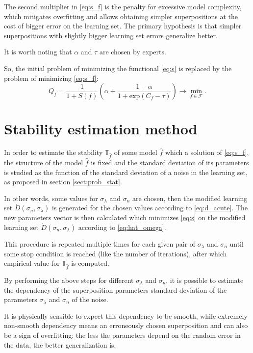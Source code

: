 \documentclass[11pt,a4paper]{article}
\theoremstyle{definition}
\begin{document}
The second multiplier in \eqref{eq:s_f} is the penalty for excessive model complexity,
which mitigates overfitting and allows obtaining simpler superpositions at the cost of
bigger error on the learning set. The primary hypothesis is that simpler superpositions
with slightly bigger learning set errors generalize better.

It is worth noting that $\alpha$ and $\tau$ are chosen by experts.

So, the initial problem of minimizing the functional \eqref{eq:s} is replaced by
the problem of minimizing \eqref{eq:s_f}:
\begin{equation}
  Q_f = \frac{1}{1 + S(f)} \left(\alpha + \frac{1 - \alpha}{1 + \text{exp} (C_f - \tau)}\right) \rightarrow \min_{f \in \mathcal{F}}.
  \label{eq:s_f_min}
\end{equation}

\section{Stability estimation method}

In order to estimate the stability $\mathbb{T}_{\hat{f}}$ of some model $\hat{f}$
which a solution of \eqref{eq:s_f}, the structure of the model $\hat{f}$ is fixed
and the standard deviation of its parameters is studied as the function of the
standard deviation of a noise in the learning set, as proposed in section
\ref{sect:prob_stat}.

In other words, some values for $\sigma_{\lambda}$ and $\sigma_n$ are chosen,
then the modified learning set $\acute{D}(\sigma_n, \sigma_{\lambda})$ is
generated for the chosen values according to \eqref{eq:d_acute}. The new
parameters vector is then calculated which minimizes \eqref{eq:s} on the
modified learning set $\acute{D}(\sigma_n, \sigma_{\lambda})$ according to
\eqref{eq:hat_omega}.

This procedure is repeated multiple times for each given pair of $\sigma_{\lambda}$ and $\sigma_n$
until some stop condition is reached (like the number of iterations), after which
empirical value for $\mathbb{T}_{\hat{f}}$ is computed.

By performing the above steps for different $\sigma_{\lambda}$ and $\sigma_n$,
it is possible to estimate the dependency of the superposition parameters
standard deviation of the parameters $\sigma_{\lambda}$ and $\sigma_n$ of the noise.

It is physically sensible to expect this dependency to be smooth, while extremely
non-smooth dependency means an erroneously chosen superposition and can also be
a sign of overfitting: the less the parameters depend on the random error
in the data, the better generalization is.
\end{document}
